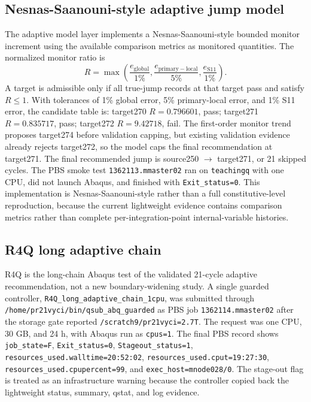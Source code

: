 \documentclass{article}
\begin{document}
\subsection*{Nesnas-Saanouni-style adaptive jump model}
The adaptive model layer implements a Nesnas-Saanouni-style bounded monitor increment using the available comparison metrics as monitored quantities. The normalized monitor ratio is
\[
R = \max\left(\frac{e_\mathrm{global}}{1\%}, \frac{e_\mathrm{primary-local}}{5\%}, \frac{e_\mathrm{S11}}{1\%}\right).
\]
A target is admissible only if all true-jump records at that target pass and satisfy \(R \leq 1\). With tolerances of 1\% global error, 5\% primary-local error, and 1\% S11 error, the candidate table is: target270 \(R=0.796601\), pass; target271 \(R=0.835717\), pass; target272 \(R=9.42718\), fail. The first-order monitor trend proposes target274 before validation capping, but existing validation evidence already rejects target272, so the model caps the final recommendation at target271. The final recommended jump is source250 \(\rightarrow\) target271, or 21 skipped cycles. The PBS smoke test \texttt{1362113.mmaster02} ran on \texttt{teachingq} with one CPU, did not launch Abaqus, and finished with \texttt{Exit\_status=0}. This implementation is Nesnas-Saanouni-style rather than a full constitutive-level reproduction, because the current lightweight evidence contains comparison metrics rather than complete per-integration-point internal-variable histories.

\subsection*{R4Q long adaptive chain}
R4Q is the long-chain Abaqus test of the validated 21-cycle adaptive recommendation, not a new boundary-widening study. A single guarded controller, \texttt{R4Q\_long\_adaptive\_chain\_1cpu}, was submitted through \texttt{/home/pr21vyci/bin/qsub\_abq\_guarded} as PBS job \texttt{1362114.mmaster02} after the storage gate reported \texttt{/scratch9/pr21vyci=2.7T}. The request was one CPU, 30 GB, and 24 h, with Abaqus run as \texttt{cpus=1}. The final PBS record shows \texttt{job\_state=F}, \texttt{Exit\_status=0}, \texttt{Stageout\_status=1}, \texttt{resources\_used.walltime=20:52:02}, \texttt{resources\_used.cput=19:27:30}, \texttt{resources\_used.cpupercent=99}, and \texttt{exec\_host=mnode028/0}. The stage-out flag is treated as an infrastructure warning because the controller copied back the lightweight status, summary, qstat, and log evidence.
\end{document}

